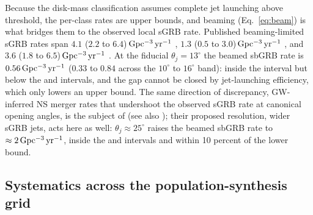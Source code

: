 \documentclass[twocolumn,amsmath]{aastex702}
\newcommand{\Gpcyr}{{\rm Gpc^{-3}\,yr^{-1}}}
\begin{document}
Because the disk-mass classification assumes complete jet launching above
threshold, the per-class rates are upper bounds, and beaming (Eq.~\ref{eq:beam})
is what bridges them to the observed local sGRB rate. Published beaming-limited
sGRB rates span $4.1$ ($2.2$ to $6.4$)$\,\Gpcyr$ \citep{wandermanpiran2015},
$1.3$ ($0.5$ to $3.0$)$\,\Gpcyr$ \citep{ghirlanda2016}, and $3.6$ ($1.8$ to
$6.5$)$\,\Gpcyr$ \citep{colombo2022}. At the fiducial $\theta_j = 13^\circ$
the beamed sbGRB rate is $0.56\,\Gpcyr$ ($0.33$ to $0.84$ across the
$10^\circ$ to $16^\circ$ band): inside the \citet{ghirlanda2016} interval but
below the \citet{wandermanpiran2015} and \citet{colombo2022} intervals, and
the gap cannot be closed by jet-launching efficiency, which only lowers an
upper bound. The same direction of discrepancy, GW-inferred NS merger rates
that undershoot the observed sGRB rate at canonical opening angles, is the
subject of \citet{kunnumkai2026} (see also \citealt{fishbach2026,jin2026});
their proposed resolution, wider sGRB jets, acts here as well: $\theta_j
\approx 25^\circ$ raises the beamed sbGRB rate to $\approx 2\,\Gpcyr$, inside
the \citet{ghirlanda2016} and \citet{colombo2022} intervals and within 10
percent of the \citet{wandermanpiran2015} lower bound.

\subsection{Systematics across the population-synthesis grid} \label{sec:systematics}
\end{document}
